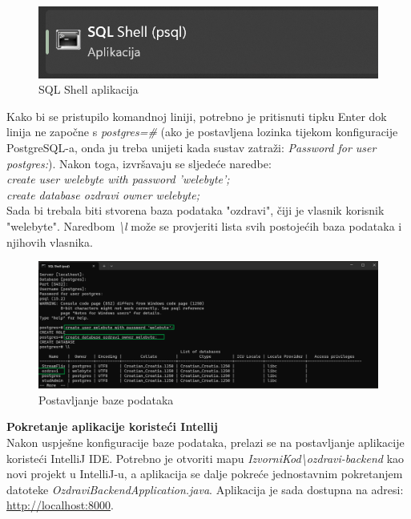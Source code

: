 	\begin{figure}[H]
		\includegraphics[width=\textwidth]{slike/sqlshell1.png} 
		\caption{SQL Shell aplikacija} 
	\end{figure}
	 Kako bi se pristupilo komandnoj liniji, potrebno je pritisnuti tipku Enter dok linija ne započne s \textit{postgres=\#}
	(ako je postavljena lozinka tijekom konfiguracije PostgreSQL-a, onda ju treba unijeti kada sustav zatraži: \textit{Password for user postgres:}). 
	Nakon toga, izvršavaju se sljedeće naredbe:\\
	\textit{create user welebyte with password 'welebyte';\\
	create database ozdravi owner welebyte;}\\
	Sada bi trebala biti stvorena baza podataka "ozdravi", čiji je vlasnik korisnik "welebyte". Naredbom \textit{\textbackslash l} može se provjeriti lista svih postojećih 
	baza podataka i njihovih vlasnika. \\
	\begin{figure}[H]
		\includegraphics[width=\textwidth]{slike/sqlshell2.png} 
		\caption{Postavljanje baze podataka} 
	\end{figure}
	\noindent\textbf{Pokretanje aplikacije koristeći Intellij} \\
	Nakon uspješne konfiguracije baze podataka, prelazi se na postavljanje aplikacije koristeći IntelliJ IDE. Potrebno je otvoriti mapu \textit{IzvorniKod\textbackslash ozdravi-backend} kao 
	novi projekt u IntelliJ-u, a aplikacija se dalje pokreće jednostavnim pokretanjem datoteke \textit{OzdraviBackendApplication.java}. Aplikacija je sada dostupna na adresi:
	\url{http://localhost:8000}.\\
	\\
